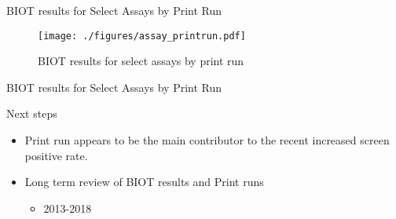 \documentclass[presentation, smaller]{beamer}
\begin{document}
\begin{frame}[label={sec:orgheadline19}]{BIOT results for Select Assays by Print Run}
\begin{figure}[htb]
\centering
\texttt{[image: ./figures/assay\_printrun.pdf]}
\caption{\label{fig:run}
BIOT results for select assays by print run}
\end{figure}
\end{frame}

\begin{frame}[label={sec:orgheadline20}]{BIOT results for Select Assays by Print Run}

\end{frame}


\begin{frame}[label={sec:orgheadline21}]{Next steps}
\begin{itemize}
\item Print run appears to be the main contributor to the recent increased
screen positive rate.
\item Long term review of BIOT results and Print runs
\begin{itemize}
\item 2013-2018
\end{itemize}
\end{itemize}
\end{frame}
\end{document}
